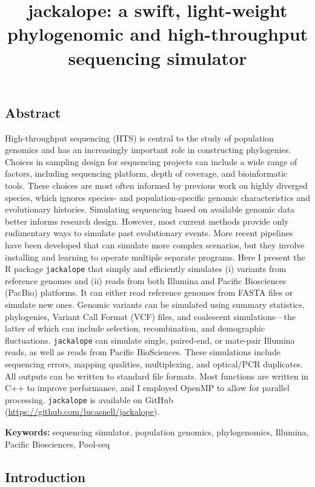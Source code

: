 \documentclass[12pt,]{article}
\title{jackalope: a swift, light-weight phylogenomic and high-throughput sequencing simulator}
\author{}
\date{}
\begin{document}
\maketitle

\hypertarget{abstract}{%
\subsection{Abstract}\label{abstract}}

High-throughput sequencing (HTS) is central to the study of population genomics
and has an increasingly important role in constructing phylogenies.
Choices in sampling design for sequencing projects can include
a wide range of factors, including sequencing platform, depth of coverage, and
bioinformatic tools.
These choices are most often informed by previous work on highly diverged species,
which ignores species- and population-specific genomic characteristics
and evolutionary histories.
Simulating sequencing based on available genomic data better informs research design.
However, most current methods provide only rudimentary ways to simulate past
evolutionary events.
More recent pipelines have been developed that can simulate more complex scenarios,
but they involve installing and learning to operate multiple separate programs.
Here I present the R package \texttt{jackalope} that simply and efficiently simulates
(i) variants from reference genomes and
(ii) reads from both Illumina and Pacific Biosciences (PacBio) platforms.
It can either read reference genomes from FASTA files or simulate new ones.
Genomic variants can be simulated using summary statistics, phylogenies,
Variant Call Format (VCF) files, and coalescent simulations---the latter of which can
include selection, recombination, and demographic fluctuations.
\texttt{jackalope} can simulate single, paired-end, or mate-pair Illumina reads,
as well as reads from Pacific BioSciences.
These simulations include sequencing errors, mapping qualities, multiplexing,
and optical/PCR duplicates.
All outputs can be written to standard file formats.
Most functions are written in C++ to improve performance, and I employed OpenMP to
allow for parallel processing.
\texttt{jackalope} is available on GitHub
(\url{https://github.com/lucasnell/jackalope}).

\textbf{Keywords:} sequencing simulator, population genomics, phylogenomics,
Illumina, Pacific Biosciences, Pool-seq

\hypertarget{introduction}{%
\subsection{Introduction}\label{introduction}}
\end{document}
